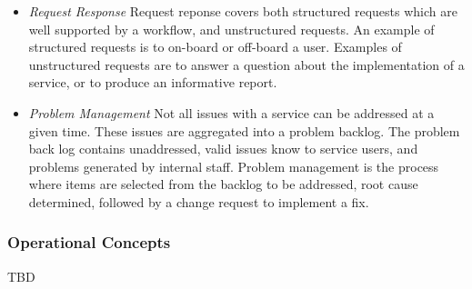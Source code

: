 \begin{enumerate}
\begin{itemize}
  \item \emph{Request Response} Request reponse covers both structured
  requests which are well supported by a workflow, and unstructured
  requests.  An example of structured requests is to on-board or
  off-board a user. Examples of unstructured requests are to answer a
  question about the implementation of a service, or to produce an
  informative report.

  \item \emph{Problem Management} Not all issues with a service can be
  addressed at a given time. These issues are aggregated into a problem
  backlog. The problem back log contains unaddressed, valid issues
  know to service users, and problems generated by internal staff.
  Problem management is the process where items are selected from the
  backlog to be addressed, root cause determined, followed by a change
  request to implement a fix.

  \end{itemize}

\end{enumerate}
\subsubsection{Operational Concepts}
TBD


